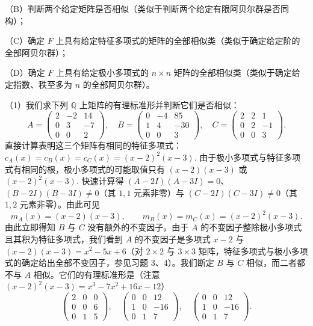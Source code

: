 （B）判断两个给定矩阵是否相似（类似于判断两个给定有限阿贝尔群是否同构）；

（C）确定 \(F\) 上具有给定特征多项式的矩阵的全部相似类（类似于确定给定阶的全部阿贝尔群）；

（D）确定 \(F\) 上具有给定极小多项式的 \(n \times n\) 矩阵的全部相似类（类似于确定给定指数、秩至多为 \(n\) 的全部阿贝尔群）。

\begin{example}
（1）我们求下列 \(\mathbb{Q}\) 上矩阵的有理标准形并判断它们是否相似：
\[
A = \begin{pmatrix} 2 & -2 & 14 \\ 0 & 3 & -7 \\ 0 & 0 & 2 \end{pmatrix}, \quad B = \begin{pmatrix} 0 & -4 & 85 \\ 1 & 4 & -30 \\ 0 & 0 & 3 \end{pmatrix}, \quad C = \begin{pmatrix} 2 & 2 & 1 \\ 0 & 2 & -1 \\ 0 & 0 & 3 \end{pmatrix}.
\]
直接计算表明这三个矩阵有相同的特征多项式：\(c_A(x) = c_B(x) = c_C(x) = (x-2)^2(x-3)\). 由于极小多项式与特征多项式有相同的根，极小多项式的可能取值只有 \((x-2)(x-3)\) 或 \((x-2)^2(x-3)\). 快速计算得 \((A-2I)(A-3I) = 0\)、\((B-2I)(B-3I) \neq 0\)（其 \(1,1\) 元素非零）与 \((C-2I)(C-3I) \neq 0\)（其 \(1,2\) 元素非零）。由此可见
\[
m_A(x) = (x-2)(x-3), \qquad m_B(x) = m_C(x) = (x-2)^2(x-3).
\]
由此立即得知 \(B\) 与 \(C\) 没有额外的不变因子。由于 \(A\) 的不变因子整除极小多项式且其积为特征多项式，我们看到 \(A\) 的不变因子是多项式 \(x-2\) 与 \((x-2)(x-3) = x^2-5x+6\)（对 \(2 \times 2\) 与 \(3 \times 3\) 矩阵，特征多项式与极小多项式的确定给出全部不变因子，参见习题 3、4）。我们断定 \(B\) 与 \(C\) 相似，而二者都不与 \(A\) 相似。它们的有理标准形是（注意 \((x-2)^2(x-3) = x^3-7x^2+16x-12\)）
\[
\begin{pmatrix} 2 & 0 & 0 \\ 0 & 0 & 6 \\ 0 & 1 & 5 \end{pmatrix}, \quad \begin{pmatrix} 0 & 0 & 12 \\ 1 & 0 & -16 \\ 0 & 1 & 7 \end{pmatrix}, \quad \begin{pmatrix} 0 & 0 & 12 \\ 1 & 0 & -16 \\ 0 & 1 & 7 \end{pmatrix}.
\]


\end{example}
